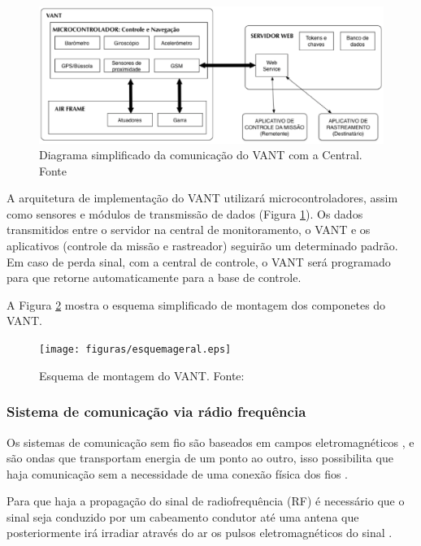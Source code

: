\begin{figure}[H]
	\centering
	  \includegraphics[keepaspectratio=true,scale=0.7]{figuras/diagrama.eps}
	\caption[Diagrama simplificado da comunicação do VANT com a Central.]{Diagrama simplificado da comunicação do VANT com a Central. Fonte \cite{Branco}}
	\label{fig:diagrama}
\end{figure}

A arquitetura de implementação do VANT utilizará microcontroladores, assim como sensores e módulos de transmissão de dados (Figura \ref{fig:diagrama}).
Os dados transmitidos entre o servidor na central de monitoramento, o VANT e os aplicativos (controle da missão e rastreador) 
seguirão um determinado padrão. Em caso de perda sinal, com a central de controle, o VANT será programado para que retorne 
automaticamente para a base de controle.

A Figura \ref{fig:esquemageral} mostra o esquema simplificado de montagem dos componetes do VANT.

\begin{figure}[H]
	\centering
	  \texttt{[image: figuras/esquemageral.eps]}
	\caption{Esquema de montagem do VANT. Fonte:\cite{esquematico}}
	\label{fig:esquemageral}
\end{figure}

\pagebreak



\subsubsection{Sistema de comunicação via rádio frequência}

Os sistemas de comunicação sem fio são baseados em campos eletromagnéticos
, e são ondas que transportam energia de um ponto ao outro, 
isso possibilita que haja comunicação sem a necessidade de uma conexão física dos fios \cite{VALLE1}. 

Para que haja a propagação do sinal de radiofrequência (RF) é necessário que o sinal seja conduzido por um cabeamento condutor até uma
antena que posteriormente irá irradiar através do ar os pulsos eletromagnéticos do sinal \cite{VALLE1}. 

